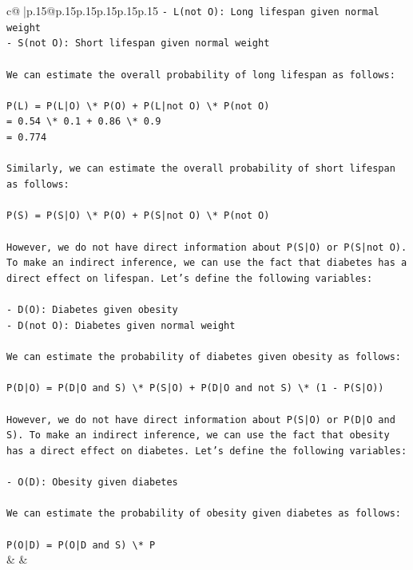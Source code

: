 \documentclass{article}
\begin{document}
{\begin{supertabular}{c@{$\;$}|p{.15\linewidth}@{}p{.15\linewidth}p{.15\linewidth}p{.15\linewidth}p{.15\linewidth}p{.15\linewidth}}
{{{\texttt{{-} L(not O): Long lifespan given normal weight} \\
\texttt{{-} S(not O): Short lifespan given normal weight} \\
\\ 
\texttt{We can estimate the overall probability of long lifespan as follows:} \\
\\ 
\texttt{P(L) = P(L|O) \textbackslash{}* P(O) + P(L|not O) \textbackslash{}* P(not O)} \\
\texttt{= 0.54 \textbackslash{}* 0.1 + 0.86 \textbackslash{}* 0.9} \\
\texttt{= 0.774} \\
\\ 
\texttt{Similarly, we can estimate the overall probability of short lifespan as follows:} \\
\\ 
\texttt{P(S) = P(S|O) \textbackslash{}* P(O) + P(S|not O) \textbackslash{}* P(not O)} \\
\\ 
\texttt{However, we do not have direct information about P(S|O) or P(S|not O). To make an indirect inference, we can use the fact that diabetes has a direct effect on lifespan. Let's define the following variables:} \\
\\ 
\texttt{{-} D(O): Diabetes given obesity} \\
\texttt{{-} D(not O): Diabetes given normal weight} \\
\\ 
\texttt{We can estimate the probability of diabetes given obesity as follows:} \\
\\ 
\texttt{P(D|O) = P(D|O and S) \textbackslash{}* P(S|O) + P(D|O and not S) \textbackslash{}* (1 {-} P(S|O))} \\
\\ 
\texttt{However, we do not have direct information about P(S|O) or P(D|O and S). To make an indirect inference, we can use the fact that obesity has a direct effect on diabetes. Let's define the following variables:} \\
\\ 
\texttt{{-} O(D): Obesity given diabetes} \\
\\ 
\texttt{We can estimate the probability of obesity given diabetes as follows:} \\
\\ 
\texttt{P(O|D) = P(O|D and S) \textbackslash{}* P} \\
            }
        }
    }
    & & \\ \\


\end{supertabular}}
\end{document}
